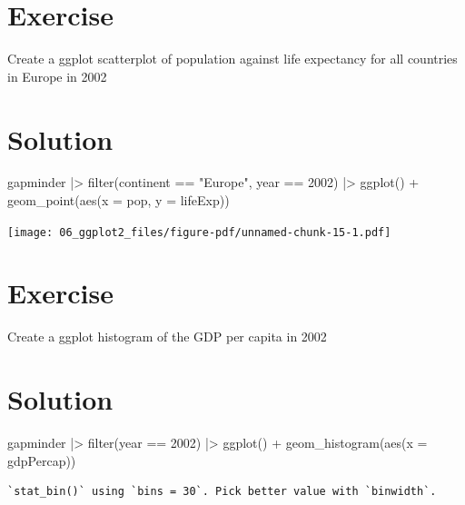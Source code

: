 \documentclass[
  letterpaper,
  DIV=11,
  numbers=noendperiod]{scrreprt}
\newenvironment{Shaded}{\begin{snugshade}}{\end{snugshade}}
\newcommand{\AttributeTok}[1]{\textcolor[rgb]{0.40,0.45,0.13}{#1}}
\newcommand{\DecValTok}[1]{\textcolor[rgb]{0.68,0.00,0.00}{#1}}
\newcommand{\FunctionTok}[1]{\textcolor[rgb]{0.28,0.35,0.67}{#1}}
\newcommand{\NormalTok}[1]{\textcolor[rgb]{0.00,0.23,0.31}{#1}}
\newcommand{\SpecialCharTok}[1]{\textcolor[rgb]{0.37,0.37,0.37}{#1}}
\newcommand{\StringTok}[1]{\textcolor[rgb]{0.13,0.47,0.30}{#1}}
\begin{document}
\section{Exercise}

Create a ggplot scatterplot of population against life expectancy for
all countries in Europe in 2002

\section{Solution}

\begin{Shaded}
\begin{Highlighting}[]
\NormalTok{gapminder }\SpecialCharTok{|\textgreater{}}
  \FunctionTok{filter}\NormalTok{(continent }\SpecialCharTok{==} \StringTok{"Europe"}\NormalTok{, year }\SpecialCharTok{==} \DecValTok{2002}\NormalTok{) }\SpecialCharTok{|\textgreater{}}
  \FunctionTok{ggplot}\NormalTok{() }\SpecialCharTok{+} 
  \FunctionTok{geom\_point}\NormalTok{(}\FunctionTok{aes}\NormalTok{(}\AttributeTok{x =}\NormalTok{ pop, }\AttributeTok{y =}\NormalTok{ lifeExp))}
\end{Highlighting}
\end{Shaded}

\texttt{[image: 06\_ggplot2\_files/figure-pdf/unnamed-chunk-15-1.pdf]}

\section{Exercise}

Create a ggplot histogram of the GDP per capita in 2002

\section{Solution}

\begin{Shaded}
\begin{Highlighting}[]
\NormalTok{gapminder }\SpecialCharTok{|\textgreater{}}
  \FunctionTok{filter}\NormalTok{(year }\SpecialCharTok{==} \DecValTok{2002}\NormalTok{) }\SpecialCharTok{|\textgreater{}}
  \FunctionTok{ggplot}\NormalTok{() }\SpecialCharTok{+} 
  \FunctionTok{geom\_histogram}\NormalTok{(}\FunctionTok{aes}\NormalTok{(}\AttributeTok{x =}\NormalTok{ gdpPercap))}
\end{Highlighting}
\end{Shaded}

\begin{verbatim}
`stat_bin()` using `bins = 30`. Pick better value with `binwidth`.
\end{verbatim}
\end{document}
